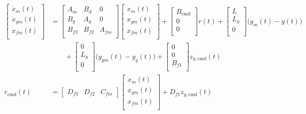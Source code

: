 \begin{equation}
  \label{eqn.fullOpenLoopReferenceModel}
  \begin{split}
    \begin{bmatrix}
      \dot{x}_{m}(t) \\
      \dot{x}_{gm}(t) \\
      \dot{x}_{fm}(t) \\
    \end{bmatrix}
    &=
    \begin{bmatrix}
      A_{m} & B_{d} & 0 \\
      B_{g} & A_{g} & 0 \\
      B_{f3} & B_{f2} & A_{fm} \\
    \end{bmatrix}
    \begin{bmatrix}
      x_{m}(t) \\
      x_{gm}(t) \\
      x_{fm}(t) \\
    \end{bmatrix}
    +
    \begin{bmatrix}
      B_{\text{cmd}} \\
      0 \\
      0 \\
    \end{bmatrix} r(t)
    +
    \begin{bmatrix}
      L \\
      L_{y} \\
      0 \\
    \end{bmatrix}\bigr(y_{m}(t)-y(t)\bigr) \\
    & \qquad +
    \begin{bmatrix}
      0 \\
      L_{g} \\
      0 \\
    \end{bmatrix}\bigr(y_{gm}(t)-y_{g}(t)\bigr)
    +
    \begin{bmatrix}
      0 \\
      0 \\
      B_{f1} \\
    \end{bmatrix}z_{g,\text{cmd}}(t) \\
    r_{\text{cmd}}(t)
    &=
    \begin{bmatrix}
      D_{f3} & D_{f2} & C_{fm}
    \end{bmatrix}
    \begin{bmatrix}
      x_{m}(t) \\
      x_{gm}(t) \\
      x_{fm}(t) \\
    \end{bmatrix}
    + D_{f1}z_{g,\text{cmd}}(t) \\
  \end{split}
\end{equation}
